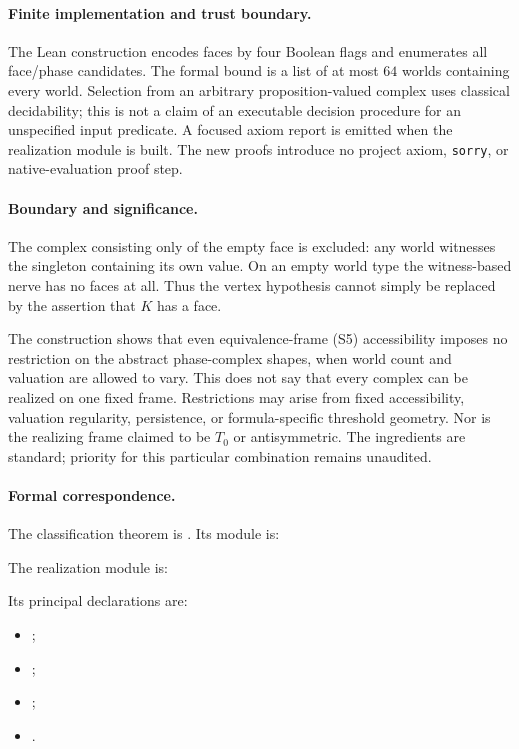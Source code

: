 \paragraph{Finite implementation and trust boundary.}
The Lean construction encodes faces by four Boolean flags and enumerates all
face/phase candidates. The formal bound is a list of at most $64$ worlds
containing every world. Selection from an arbitrary proposition-valued complex
uses classical decidability; this is not a claim of an executable decision
procedure for an unspecified input predicate. A focused axiom report is emitted
when the realization module is built. The new proofs introduce no project axiom,
\texttt{sorry}, or native-evaluation proof step.

\paragraph{Boundary and significance.}
The complex consisting only of the empty face is excluded: any world witnesses
the singleton containing its own value. On an empty world type the witness-based
nerve has no faces at all. Thus the vertex hypothesis cannot simply be replaced
by the assertion that $K$ has a face.

The construction shows that even equivalence-frame (S5) accessibility imposes
no restriction on the abstract phase-complex shapes, when world count and
valuation are allowed to vary. This does not say that every complex can be
realized on one fixed frame. Restrictions may arise from fixed accessibility,
valuation regularity, persistence, or formula-specific threshold geometry.
Nor is the realizing frame claimed to be $T_0$ or antisymmetric. The ingredients
are standard; priority for this particular combination remains unaudited.

\paragraph{Formal correspondence.}
The classification theorem is
. Its module is:
\par{}\par

The realization module is:
\par{}\par
Its principal declarations are:
\begin{itemize}
\item {};
\item {};
\item {};
\item {}.
\end{itemize}
